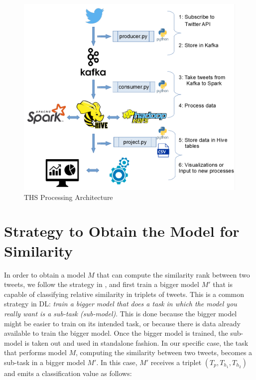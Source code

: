 \documentclass[12pt]{report}
\begin{document}
\begin{figure}[H]	
	\centering
	\includegraphics[width=150mm, scale = 1]{images/6_ths_system.png}	
	\caption{\ac{THS} Processing Architecture}	
	\label{figure:ths_system}
\end{figure}

\section{Strategy to Obtain the Model for Similarity \label{strategy}}
In order to obtain a model $M$ that can compute the similarity rank between two tweets, we follow the strategy in \cite{Wang2014}, and first train a bigger model $M'$
that is capable of classifying relative similarity in triplets of tweets. This is a common strategy in \ac{DL}: {\em train a bigger model that does a task in which the model you really want is  
	a sub-task (sub-model)}. This is done because the bigger model might be easier to train on its intended task, or because there is data already available to train the bigger model.  Once the bigger model is trained, the sub-model is taken out and used in standalone fashion. In our specific case, the task that performs model $M$, computing the similarity between two tweets, becomes a sub-task in a bigger
model $M'$. In this case, $M'$ receives a triplet $(T_p, T_{h_1}, T_{h_2})$ and emits a classification value as follows: 
\end{document}
